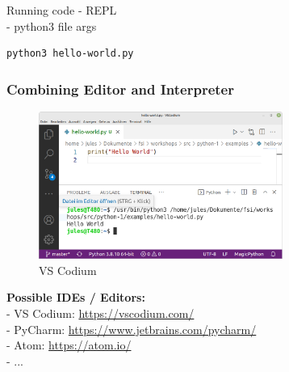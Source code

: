\documentclass{beamer}
\begin{document}
\begin{frame}[fragile]
	\begin{block}{Running code}
		- REPL\\
		- python3 file args
	\end{block}
	\begin{example}
			\begin{verbatim}
python3 hello-world.py
		\end{verbatim}
	\end{example}
\end{frame}

\begin{frame}
	\frametitle{Combining Editor and Interpreter}
	\begin{figure}
		\includegraphics[width=8cm]{figures/vs-code.png}
		\caption{VS Codium}
	\end{figure}
\end{frame}
\begin{frame}
	\textbf{Possible IDEs / Editors:}\\
	- VS Codium: \url{https://vscodium.com/}\\
	- PyCharm: \url{https://www.jetbrains.com/pycharm/}\\
	- Atom: \url{https://atom.io/}\\
	- ...
\end{frame}
\end{document}
